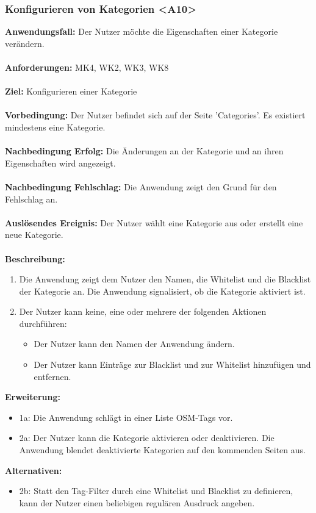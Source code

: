\documentclass[parskip=full]{scrartcl} %
\begin{document}
\subsubsection*{Konfigurieren von Kategorien <A10>}
\textbf{Anwendungsfall:} Der Nutzer möchte die Eigenschaften einer Kategorie verändern.\\\\
\textbf{Anforderungen:} MK4, WK2, WK3, WK8\\\\
\textbf{Ziel:} Konfigurieren einer Kategorie \\\\
\textbf{Vorbedingung:} Der Nutzer befindet sich auf der Seite 'Categories'. Es existiert mindestens eine Kategorie.\\\\
\textbf{Nachbedingung Erfolg:} Die Änderungen an der Kategorie und an ihren Eigenschaften wird angezeigt. \\\\
\textbf{Nachbedingung Fehlschlag:} Die Anwendung zeigt den Grund für den Fehlschlag an. \\\\
\textbf{Auslösendes Ereignis:} Der Nutzer wählt eine Kategorie aus oder erstellt eine neue Kategorie. \\\\
\textbf{Beschreibung:}
\begin{enumerate}
    \item Die Anwendung zeigt dem Nutzer den Namen, die Whitelist und die Blacklist der Kategorie an. Die Anwendung signalisiert, ob die Kategorie aktiviert ist.
    \item Der Nutzer kann keine, eine oder mehrere der folgenden Aktionen durchführen:
    \begin{itemize}
        \item Der Nutzer kann den Namen der Anwendung ändern.
        \item Der Nutzer kann Einträge zur Blacklist und zur Whitelist hinzufügen und entfernen.
    \end{itemize}
\end{enumerate}
\textbf{Erweiterung:}
\begin{itemize}
    \item 1a: Die Anwendung schlägt in einer Liste OSM-Tags vor.
    \item 2a: Der Nutzer kann die Kategorie aktivieren oder deaktivieren. Die Anwendung blendet deaktivierte Kategorien auf den kommenden Seiten aus.
\end{itemize}
\textbf{Alternativen:}
\begin{itemize}
    \item 2b: Statt den Tag-Filter durch eine Whitelist und Blacklist zu definieren, kann der Nutzer einen beliebigen regulären Ausdruck angeben.
\end{itemize}
\newpage
\end{document}
